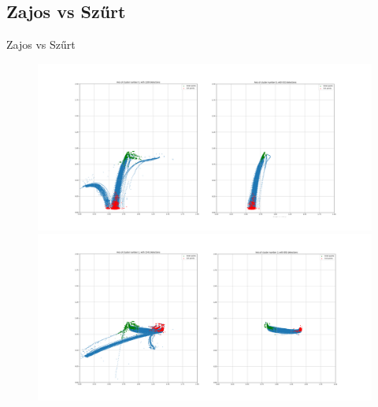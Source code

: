 \documentclass{beamer}
\begin{document}
\subsection{Zajos vs Szűrt}
\begin{frame}{Zajos vs Szűrt}
    \begin{figure}
        \includegraphics[scale=0.1]{../clustering/n_cluster_0_before_after.png}
        \includegraphics[scale=0.1]{../clustering/n_cluster_2_before_after.png}
    \end{figure}
\end{frame}
\end{document}
